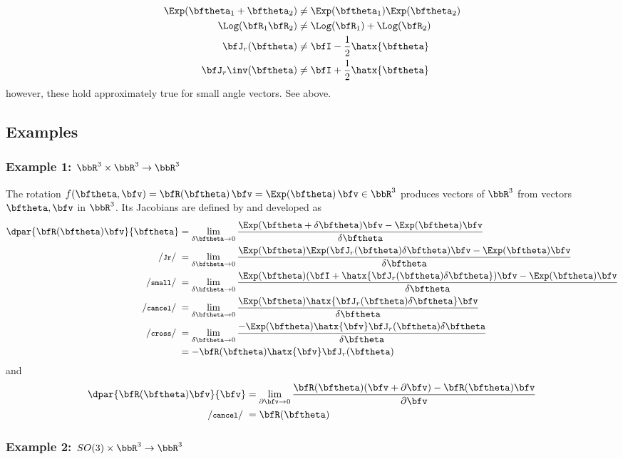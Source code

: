 \begin{align}
\Exp(\bth_1+\bth_2) &\ne \Exp(\bth_1)\Exp(\bth_2) \\
\Log(\bfR_1\bfR_2) &\ne \Log(\bfR_1) + \Log(\bfR_2) \\
\bfJ_r(\bth) &\ne \bfI - \frac12\hatx{\bth} \\
\bfJ_r\inv(\bth) &\ne \bfI + \frac12\hatx{\bth} 
\end{align}
%
however, these hold approximately true for small angle vectors. See \csmall above.


\subsection{Examples}

\subsubsection{Example 1: $\bbR^3\times\bbR^3\to\bbR^3$} 

The rotation $f(\bth,\bfv) = \bfR(\bth)\,\bfv = \Exp(\bth)\,\bfv \in \bbR^3$ produces vectors of $\bbR^3$ from vectors $\bth,\bfv$ in $\bbR^3$. Its Jacobians are defined by  and developed as
%
\begin{align*}
\dpar{\bfR(\bth)\bfv}{\bth} 
&= \lim_{\delta\bth\to0}\frac{\Exp(\bth+\delta\bth)\bfv-\Exp(\bth)\bfv}{\delta\bth} \\
\cJr
&= \lim_{\delta\bth\to0}\frac{\Exp(\bth)\Exp(\bfJ_r(\bth)\delta\bth)\bfv-\Exp(\bth)\bfv}{\delta\bth} \\
\csmall
&= \lim_{\delta\bth\to0}\frac{\Exp(\bth)(\bfI+\hatx{\bfJ_r(\bth)\delta\bth})\bfv-\Exp(\bth)\bfv}{\delta\bth} \\
\ccancel
&= \lim_{\delta\bth\to0}\frac{\Exp(\bth)\hatx{\bfJ_r(\bth)\delta\bth}\bfv}{\delta\bth} \\
\ccross
&= \lim_{\delta\bth\to0}\frac{-\Exp(\bth)\hatx{\bfv}\bfJ_r(\bth)\delta\bth}{\delta\bth} \\
&= -\bfR(\bth)\hatx{\bfv}\bfJ_r(\bth) 
\end{align*}
%
and
%
\begin{align*}
\dpar{\bfR(\bth)\bfv}{\bfv} 
&= \lim_{\partial\bfv\to0}\frac{\bfR(\bth)(\bfv+\partial\bfv)-\bfR(\bth)\bfv}{\partial\bfv} \\
\com{cancel} 
&= \bfR(\bth)
\end{align*}

\subsubsection{Example 2: $SO(3)\times\bbR^3\to\bbR^3$} 


